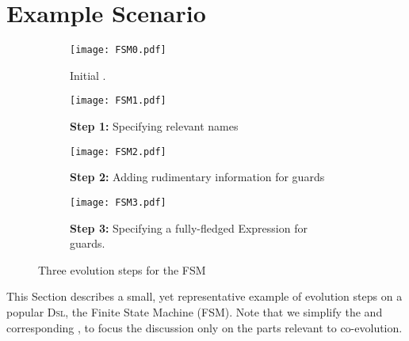\section{Example Scenario}
\label{sec:Example}

\begin{figure*}
    \centering
    \begin{subfigure}[b]{0.45\textwidth}
			\centering
      \texttt{[image: FSM0.pdf]}
      \caption{Initial \metamodel.}
      \label{fig:FSM:Init}
    \end{subfigure}
    \hfill
    \begin{subfigure}[b]{0.45\textwidth}
			\centering
      \texttt{[image: FSM1.pdf]}
      \caption{\textbf{Step 1:} Specifying relevant \textsf{name}s}
      \label{fig:FSM:Relevant}
    \end{subfigure}
    \hfill
    \begin{subfigure}[b]{0.45\textwidth}
			\centering
      \texttt{[image: FSM2.pdf]}
      \caption{\textbf{Step 2:} Adding rudimentary information for guards}
      \label{fig:FSM:Guard}
    \end{subfigure}
    \hfill 
		\begin{subfigure}[b]{0.45\textwidth}
			\centering
      \texttt{[image: FSM3.pdf]}
      \caption{\textbf{Step 3:} Specifying a fully-fledged \textsf{Expression} for \textsf{guard}s.}
      \label{fig:FSM:Expression}
    \end{subfigure}
    \caption{Three evolution steps for the \textsf{FSM} \metamodel}
    \label{fig:FSM}
\end{figure*}


This Section describes a small, yet representative example of \metamodel
evolution steps on a popular \textsc{Dsl}, the Finite State Machine (\textsf{FSM}).
Note that we simplify the \metamodels and corresponding \viewtypes, to focus 
the discussion only on the parts relevant to co-evolution. 

